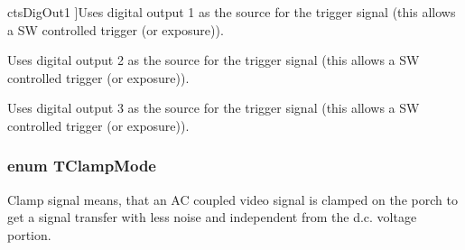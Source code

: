 \begin{Desc}
\begin{description}
{\hypertarget{group___device_specific_interface_gga18243d80e95a98e9596ed83ed96cdb54adb2a7247120e4ed497d65be49b685a77}{cts\+Dig\+Out1}\label{group___device_specific_interface_gga18243d80e95a98e9596ed83ed96cdb54adb2a7247120e4ed497d65be49b685a77}
}]Uses digital output 1 as the source for the trigger signal (this allows a S\+W controlled trigger (or exposure)). \item[{\em 
\hypertarget{group___device_specific_interface_gga18243d80e95a98e9596ed83ed96cdb54a5f40b064c21fbd0bbba6f6db0201acf4}{cts\+Dig\+Out2}\label{group___device_specific_interface_gga18243d80e95a98e9596ed83ed96cdb54a5f40b064c21fbd0bbba6f6db0201acf4}
}]Uses digital output 2 as the source for the trigger signal (this allows a S\+W controlled trigger (or exposure)). \item[{\em 
\hypertarget{group___device_specific_interface_gga18243d80e95a98e9596ed83ed96cdb54a8f56f13fe6c448a76510671f8dd86a8d}{cts\+Dig\+Out3}\label{group___device_specific_interface_gga18243d80e95a98e9596ed83ed96cdb54a8f56f13fe6c448a76510671f8dd86a8d}
}]Uses digital output 3 as the source for the trigger signal (this allows a S\+W controlled trigger (or exposure)). \end{description}
\end{Desc}
\hypertarget{group___device_specific_interface_gad42717c53ece3c90f468265fd0267ad2}{
\subsubsection[{T\+Clamp\+Mode}]{\setlength{\rightskip}{0pt plus 5cm}enum {\bf T\+Clamp\+Mode}}}\label{group___device_specific_interface_gad42717c53ece3c90f468265fd0267ad2}


Clamp signal means, that an A\+C coupled video signal is clamped on the porch to get a signal transfer with less noise and independent from the d.\+c. voltage portion. 

